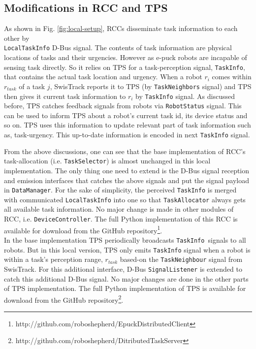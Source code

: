 \subsection*{Modifications in RCC and TPS}
As shown in Fig. \ref{fig:local-setup}, RCCs disseminate task information to each other by\\ \texttt{LocalTaskInfo} D-Bus signal. The contents of task information are physical locations of tasks and their urgencies. However as e-puck robots are incapable of sensing task directly. So it relies on TPS for a task-perception signal, \texttt{TaskInfo}, that contains the actual task location and urgency. When a robot $r_i$ comes within $r_{task}$ of a task $j$, SwisTrack reports it to TPS (by \texttt{TaskNeighbors} signal) and TPS then gives it current task information to $r_i$ by  \texttt{TaskInfo} signal. As discussed before, TPS catches feedback signals from robots via \texttt{RobotStatus} signal. This can be used to inform TPS about a robot's current task id, its device status and so on. TPS uses this information to update relevant part of task information such as, task-urgency. This up-to-date information is encoded in next \texttt{TaskInfo} signal.

From the above discussions, one can see that the base implementation of RCC's task-allocation (i.e. \texttt{TaskSelector}) is almost unchanged in this local implementation. The only thing one need to extend is the D-Bus signal reception and emission interfaces that catches the above signals and put the signal payload in \texttt{DataManager}. For the sake of simplicity, the perceived \texttt{TaskInfo} is merged with communicated \texttt{LocalTaskInfo} into one so that \texttt{TaskAllocator} always gets all available task information. No major change is made in other modules of RCC, i.e. \texttt{DeviceController}. The full Python implementation of this RCC is available for download from the GitHub repository\footnote{http://github.com/roboshepherd/EpuckDistributedClient }.\\ 
In the base implementation TPS periodically broadcasts \texttt{TaskInfo }signals to all robots. But in this local version, TPS only emits \texttt{TaskInfo} signal when a robot is within a task's perception range, $r_{task}$ based-on the \texttt{TaskNeighbour} signal from SwisTrack. For this additional interface, D-Bus \texttt{SignalListener} is extended to catch this additional D-Bus signal.  No major changes are done in the other parts of TPS implementation. The full Python implementation of TPS is available for download from the GitHub repository\footnote{http://github.com/roboshepherd/DitributedTaskServer}.
